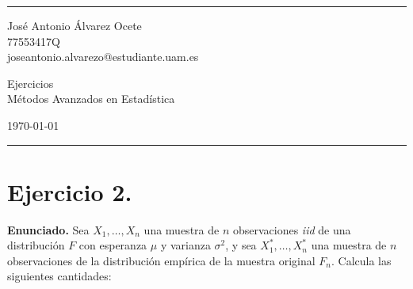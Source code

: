 \documentclass[a4paper]{article}
\begin{document}

\fancyhead[C]{}
\hrule \medskip %
\begin{minipage}{0.295\textwidth} 
\raggedright
\footnotesize
José Antonio Álvarez Ocete \hfill\\   
77553417Q \hfill\\
joseantonio.alvarezo@estudiante.uam.es
\end{minipage}
\begin{minipage}{0.4\textwidth} 
\centering 
\large 
Ejercicios\\ 
\normalsize 
Métodos Avanzados en Estadística\\ 
\end{minipage}
\begin{minipage}{0.295\textwidth} 
\raggedleft
\today\hfill\\
\end{minipage}
\medskip\hrule 
\bigskip
	

\section*{Ejercicio 2.}

\textbf{Enunciado.} Sea $X_1, \ldots, X_n$ una muestra de $n$ observaciones \emph{iid} de una distribución $F$ con esperanza $\mu$ y varianza $\sigma^2$, y sea $X_1^*, \ldots, X_n^*$ una muestra de $n$ observaciones de la distribución empírica de la muestra original $F_n$. Calcula las siguientes cantidades: \\
\end{document}
